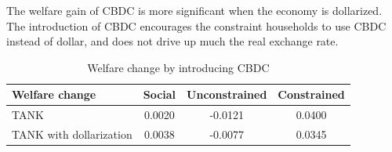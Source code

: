 \documentclass[12pt]{article}
\begin{document}
The welfare gain of CBDC is more significant when the economy is dollarized. The introduction of CBDC encourages the constraint households to use CBDC instead of dollar, and does not drive up much the real exchange rate. 

\begin{table}[h!]
\centering
\begin{tabular}{lccc}
\hline\hline
Welfare change & Social & Unconstrained & Constrained  \\ \hline
TANK &    0.0020  &  -0.0121 &   0.0400\\
TANK with dollarization &  0.0038  &  -0.0077  &  0.0345 \\\hline
\end{tabular}
\caption{Welfare change by introducing CBDC}
\label{Welfare2}
\end{table}
\end{document}
